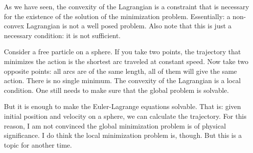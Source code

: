\documentclass[aps,pra,10pt,floatfix,nofootinbib]{revtex4-1}
\theoremstyle{definition}
\begin{document}
As we have seen, the convexity of the Lagrangian is a constraint that is necessary for the existence of the solution of the minimization problem. Essentially: a non-convex Lagrangian is not a well posed problem. Also note that this is just a necessary condition: it is not sufficient.

Consider a free particle on a sphere. If you take two points, the trajectory that minimizes the action is the shortest arc traveled at constant speed. Now take two opposite points: all arcs are of the same length, all of them will give the same action. There is no single minimum. The convexity of the Lagrangian is a local condition. One still needs to make sure that the global problem is solvable.

But it is enough to make the Euler-Lagrange equations solvable. That is: given initial position and velocity on a sphere, we can calculate the trajectory. For this reason, I am not convinced the global minimization problem is of physical significance. I do think the local minimization problem is, though. But this is a topic for another time.
\end{document}
